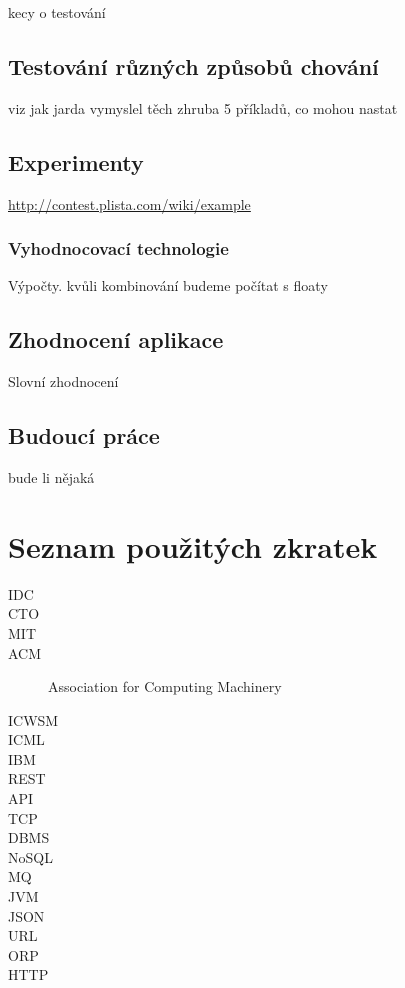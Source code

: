 \documentclass[thesis=M,czech]{FITthesis}[2014/05/07]
\begin{document}
kecy o testování
\section{Testování různých způsobů chování}
viz jak jarda vymyslel těch zhruba 5 příkladů, co mohou nastat
\section{Experimenty}

\url{http://contest.plista.com/wiki/example}
	\subsection{Vyhodnocovací technologie}	
	Výpočty. kvůli kombinování budeme počítat s floaty
	

\section{Zhodnocení aplikace}
Slovní zhodnocení
\section{Budoucí práce}
bude li nějaká

\begin{conclusion}
\end{conclusion}




\appendix

\chapter{Seznam použitých zkratek}
\begin{description}
	\item[IDC] 
	\item[CTO]
	\item[MIT]	
	\item[ACM] Association for Computing Machinery	
	\item[ICWSM]	
	\item[ICML]	
	\item[IBM]	
	\item[REST]	
	\item[API]							
	\item[TCP]
	\item[DBMS]
	\item[NoSQL]
	\item[MQ]
	\item[JVM]
	\item[JSON]
	\item[URL]
	\item[ORP]
	\item[HTTP]
\end{description}
\end{document}
